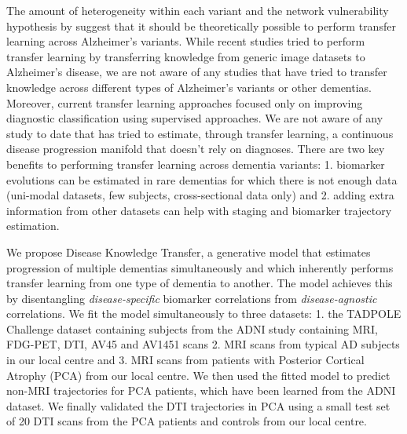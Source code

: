 \documentclass{llncs}
\begin{document}
The amount of heterogeneity within each variant and the network vulnerability hypothesis by \cite{seeley2009neurodegenerative} suggest that it should be theoretically possible to perform transfer learning across Alzheimer's variants. While recent studies \cite{hon2017towards} tried to perform transfer learning by transferring knowledge from generic image datasets to Alzheimer's disease, we are not aware of any studies that have tried to transfer knowledge across different types of Alzheimer's variants or other dementias. Moreover, current transfer learning approaches focused only on improving diagnostic classification using supervised approaches. We are not aware of any study to date that has tried to estimate, through transfer learning, a continuous disease progression manifold that doesn't rely on diagnoses. There are two key benefits to performing transfer learning across dementia variants: 1. biomarker evolutions can be estimated in rare dementias for which there is not enough data (uni-modal datasets, few subjects, cross-sectional data only) and 2. adding extra information from other datasets can help with staging and biomarker trajectory estimation.

We propose Disease Knowledge Transfer, a generative model that estimates progression of multiple dementias simultaneously and which inherently performs transfer learning from one type of dementia to another. The model achieves this by disentangling \emph{disease-specific} biomarker correlations from \emph{disease-agnostic} correlations.  We fit the model simultaneously to three datasets: 1. the TADPOLE Challenge dataset containing subjects from the ADNI study containing MRI, FDG-PET, DTI, AV45 and AV1451 scans 2. MRI scans from typical AD subjects in our local centre and 3. MRI scans from patients with Posterior Cortical Atrophy (PCA) from our local centre. We then used the fitted model to predict non-MRI trajectories for PCA patients, which have been learned from the ADNI dataset. We finally validated the DTI trajectories in PCA using a small test set of 20 DTI scans from the PCA patients and controls from our local centre.
% 
% 
% 
%
\end{document}
